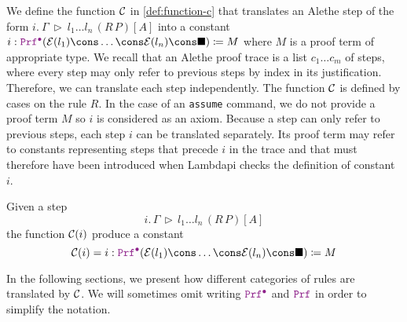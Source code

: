 We define the function $\cal{C}$ in \cref{def:function-c} that translates an Alethe step of the form $i.~\Gamma~\triangleright~l_1 \dots l_n\,(R\,P)[A]$ into a constant $i: \pid (\E{l_1}\cons\dots\cons\E{l_n}\cons \nil) \coloneq M$ where $M$ is a proof term of appropriate type.
We recall that an Alethe proof trace is a list $c_1 \dots c_m$ of steps, where every step may only refer to previous steps by index in its justification. Therefore, we can translate each step independently.
The function $\cal{C}$ is defined by cases on the rule $R$. In the case of an \texttt{assume} command, we do not provide a proof term $M$ so $i$ is considered as an axiom. Because a step can only refer to previous steps, each step $i$ can be translated separately. Its proof term may refer to constants representing steps that precede $i$ in the trace and that must therefore have been introduced when Lambdapi checks the definition of constant~$i$.

\begin{definition}
Given a step 
\[
  i. \, \Gamma \, \triangleright\, l_1 \dots l_n\,(R\,P)[A]
\]
the function $\cal{C}(i)$ produce a constant
\[
  \cal{C}(i) = i: \pid (\E{l_1}\cons\dots\cons\E{l_n}\cons \nil) \coloneq M
\]
\label{def:function-c}
\end{definition}

In the following sections, we present how different categories of rules are translated by $\cal{C}$. We will sometimes omit writing $\pid$ and $\prf$ in order to simplify the notation.